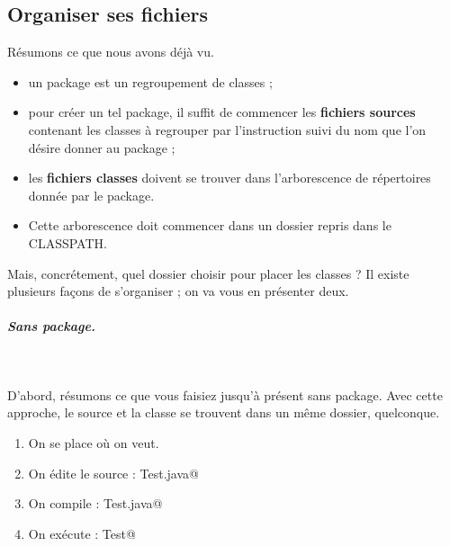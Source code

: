 \documentclass[11pt,a4paper]{article}
\begin{document}
            \par
        \subsection{Organiser ses fichiers}
				R\'esumons ce que  nous avons d\'ej\`a vu.
			
            \par
        
					\begin{itemize}
				
			\item 
					un package est un regroupement de classes ;
				
			\item 
					pour cr\'eer un tel package,
					il suffit de commencer les 
					\textbf{fichiers sources} 
					contenant les classes \`a regrouper
					par l'instruction 
					\verb@package@ 
					suivi du nom 
					que l'on d\'esire donner au package ;
				
			\item 
					les \textbf{fichiers classes} 
					doivent se trouver dans l'arborescence de r\'epertoires 
					donn\'ee par le package.
				
			\item 
					Cette arborescence doit commencer dans un dossier
					repris dans le CLASSPATH.
				
					\end{itemize}
				
				Mais, concr\'etement,
				quel dossier choisir pour placer les classes ?
				Il existe plusieurs fa\c cons de s'organiser ;
				on va vous en pr\'esenter deux. 
			
            \par
        
			
		\subparagraph{Sans package.} 
		
					\textcolor{white}{.} \par
				
				D'abord, r\'esumons ce que vous faisiez jusqu'\`a pr\'esent
				sans package.
				Avec cette approche, le source et la classe
				se trouvent dans un m\^eme dossier, quelconque.
			
            \par
        
					\begin{enumerate}
				
			\item 
					On se place o\`u on veut.
				
			\item 
					On \'edite le source : \verb@nano Test.java@
			\item 
					On compile : \verb@javac Test.java@
			\item 
					On ex\'ecute : \verb@java Test@
					\end{enumerate}
				
\end{document}
